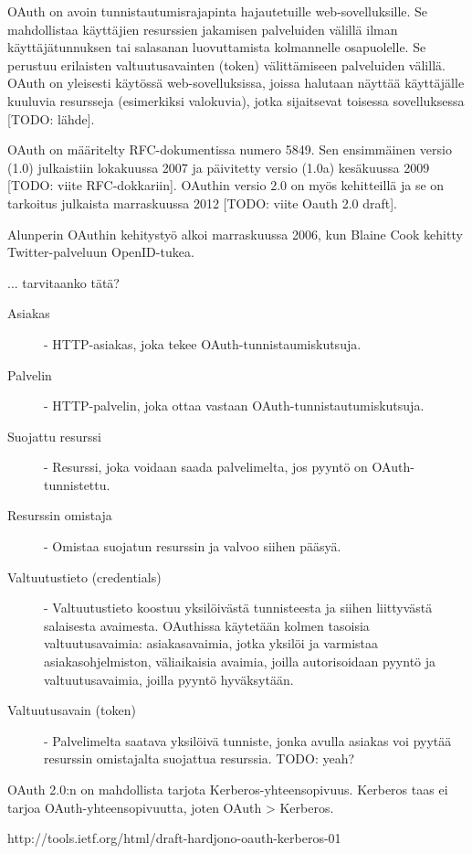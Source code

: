 OAuth on avoin tunnistautumisrajapinta hajautetuille web-sovelluksille. Se mahdollistaa käyttäjien resurssien jakamisen palveluiden välillä ilman käyttäjätunnuksen tai salasanan luovuttamista kolmannelle osapuolelle. Se perustuu erilaisten valtuutusavainten (token) välittämiseen palveluiden välillä. OAuth on yleisesti käytössä web-sovelluksissa, joissa halutaan näyttää käyttäjälle kuuluvia resursseja (esimerkiksi valokuvia), jotka sijaitsevat toisessa sovelluksessa [TODO: lähde].

OAuth on määritelty RFC-dokumentissa numero 5849. Sen ensimmäinen versio (1.0) julkaistiin lokakuussa 2007 ja päivitetty versio (1.0a) kesäkuussa 2009 [TODO: viite RFC-dokkariin]. OAuthin versio 2.0 on myös kehitteillä ja se on tarkoitus julkaista marraskuussa 2012 [TODO: viite Oauth 2.0 draft].

Alunperin OAuthin kehitystyö alkoi marraskuussa 2006, kun Blaine Cook kehitty Twitter-palveluun OpenID-tukea.

... tarvitaanko tätä?

\begin{description}
  \item[Asiakas] - HTTP-asiakas, joka tekee OAuth-tunnistaumiskutsuja.

  \item[Palvelin] - HTTP-palvelin, joka ottaa vastaan OAuth-tunnistautumiskutsuja.

  \item[Suojattu resurssi] - Resurssi, joka voidaan saada palvelimelta, jos pyyntö on OAuth-tunnistettu.

  \item[Resurssin omistaja] - Omistaa suojatun resurssin ja valvoo siihen pääsyä.

  \item[Valtuutustieto (credentials)] - Valtuutustieto koostuu yksilöivästä tunnisteesta ja siihen liittyvästä salaisesta avaimesta. OAuthissa käytetään kolmen tasoisia valtuutusavaimia: asiakasavaimia, jotka yksilöi ja varmistaa asiakasohjelmiston, väliaikaisia avaimia, joilla autorisoidaan pyyntö ja valtuutusavaimia, joilla pyyntö hyväksytään.

  \item[Valtuutusavain (token)] - Palvelimelta saatava yksilöivä tunniste, jonka avulla asiakas voi pyytää resurssin omistajalta suojattua resurssia. TODO: yeah?
\end{description}

OAuth 2.0:n on mahdollista tarjota Kerberos-yhteensopivuus. Kerberos taas ei tarjoa OAuth-yhteensopivuutta, joten OAuth > Kerberos.

http://tools.ietf.org/html/draft-hardjono-oauth-kerberos-01

